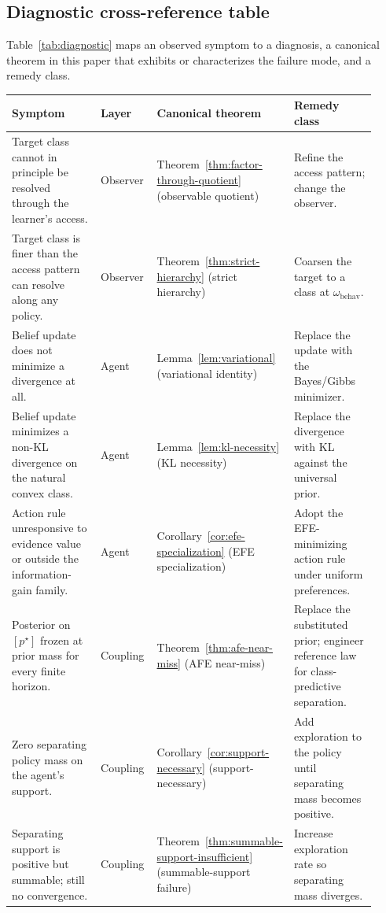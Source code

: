 \subsection{Diagnostic cross-reference table}
\label{app:diagnostic-table}

Table~\ref{tab:diagnostic} maps an observed symptom to a diagnosis, a canonical theorem in this paper that exhibits or characterizes the failure mode, and a remedy class.

\begin{table}[h]
\centering\small
\renewcommand{\arraystretch}{1.25}
\begin{tabular}{p{0.30\linewidth}p{0.16\linewidth}p{0.20\linewidth}p{0.26\linewidth}}
\toprule
Symptom & Layer & Canonical theorem & Remedy class \\
\midrule
Target class cannot in principle be resolved through the learner's access. & Observer & Theorem~\ref{thm:factor-through-quotient} (observable quotient) & Refine the access pattern; change the observer. \\
Target class is finer than the access pattern can resolve along any policy. & Observer & Theorem~\ref{thm:strict-hierarchy} (strict hierarchy) & Coarsen the target to a class at $\omega_{\mathrm{behav}}$. \\
Belief update does not minimize a divergence at all. & Agent & Lemma~\ref{lem:variational} (variational identity) & Replace the update with the Bayes/Gibbs minimizer. \\
Belief update minimizes a non-KL divergence on the natural convex class. & Agent & Lemma~\ref{lem:kl-necessity} (KL necessity) & Replace the divergence with KL against the universal prior. \\
Action rule unresponsive to evidence value or outside the information-gain family. & Agent & Corollary~\ref{cor:efe-specialization} (EFE specialization) & Adopt the EFE-minimizing action rule under uniform preferences. \\
Posterior on $[p^\star]$ frozen at prior mass for every finite horizon. & Coupling & Theorem~\ref{thm:afe-near-miss} (AFE near-miss) & Replace the substituted prior; engineer reference law for class-predictive separation. \\
Zero separating policy mass on the agent's support. & Coupling & Corollary~\ref{cor:support-necessary} (support-necessary) & Add exploration to the policy until separating mass becomes positive. \\
Separating support is positive but summable; still no convergence. & Coupling & Theorem~\ref{thm:summable-support-insufficient} (summable-support failure) & Increase exploration rate so separating mass diverges. \\

\end{tabular}
\end{table}
